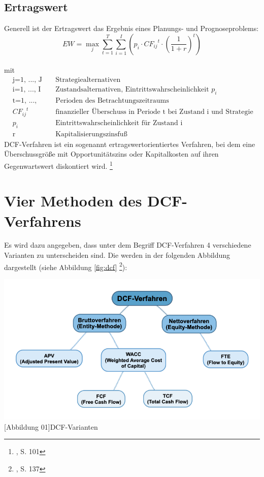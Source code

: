 \documentclass[12pt,a4paper,bibliography=totocnumbered,listof=totocnumbered]{article}
\begin{document}
\subsection{Ertragswert}
Generell ist der Ertragswert das Ergebnis eines Planungs- und Prognoseproblems:
\[EW = \underset{j}{\max}\sum_{t=1}^{T}\sum_{i=1}^{I}(p_{i} \cdot {CF_{ij}}^{t} \cdot (\frac{1}{1+r})^{t}) \] \\
mit
\begin{align*}
	&\text{j=1, ..., J} &&\text{Strategiealternativen} \\
	&\text{i=1, ..., I} &&\text{Zustandsalternativen, Eintrittswahrscheinlichkeit \(p_{i}\)} \\
	&\text{t=1, ..., T} &&\text{Perioden des Betrachtungszeitraums} \\
	&{CF_{ij}}^{t}  &&\text{finanzieller Überschuss in Periode t bei Zustand i und Strategie j} \\
	&p_{i}  &&\text{Eintrittswahrscheinlichkeit für Zustand i} \\
	&\text{r} &&\text{Kapitalisierungszinsfuß} 
\end{align*}
DCF-Verfahren ist ein sogenannt ertragswertorientiertes Verfahren, bei dem eine Überschussgröße mit Opportunitätszins oder Kapitalkosten auf ihren Gegenwartswert diskontiert wird.
\footnote[1]{\cite{Behringer2009}, S. 101}
\newline
\pagebreak

\section{Vier Methoden des DCF-Verfahrens}
Es wird dazu angegeben, dass unter dem Begriff DCF-Verfahren 4 verschiedene Varianten zu unterscheiden sind. 
Die werden in der folgenden Abbildung dargestellt (siehe Abbildung \ref{fig:dcf} \footnote[2]{\cite{Ballwieser2016}, S. 137}):  \\
\begin{minipage}{\linewidth}
	\centering
	\includegraphics[width=0.5\linewidth]{pics/DCF-Verfahren.png}
	[Abbildung 01]{DCF-Varianten}
	\label{fig:dcf}
\end{minipage}	
\end{document}
